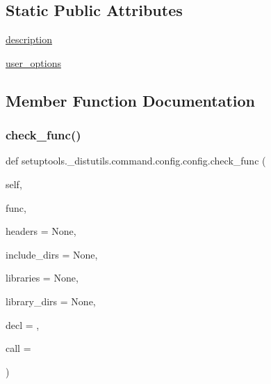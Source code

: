 \subsection*{Static Public Attributes}
\begin{DoxyCompactItemize}
\item 
\hyperlink{classsetuptools_1_1__distutils_1_1command_1_1config_1_1config_a2e606f2a5ac0b2ddd36a381b65e65a76}{description}
\item 
\hyperlink{classsetuptools_1_1__distutils_1_1command_1_1config_1_1config_acd5e5e9f22c868b6b2e0d0595b6e6979}{user\+\_\+options}
\end{DoxyCompactItemize}


\subsection{Member Function Documentation}
\mbox{\label{classsetuptools_1_1__distutils_1_1command_1_1config_1_1config_a9273e7516a033574016cf15047afa760}} 
\subsubsection{\texorpdfstring{check\+\_\+func()}{check\_func()}}
{\footnotesize\ttfamily def setuptools.\+\_\+distutils.\+command.\+config.\+config.\+check\+\_\+func (\begin{DoxyParamCaption}\item[{}]{self,  }\item[{}]{func,  }\item[{}]{headers = {\ttfamily None},  }\item[{}]{include\+\_\+dirs = {\ttfamily None},  }\item[{}]{libraries = {\ttfamily None},  }\item[{}]{library\+\_\+dirs = {\ttfamily None},  }\item[{}]{decl = {},  }\item[{}]{call = {} }\end{DoxyParamCaption})}


